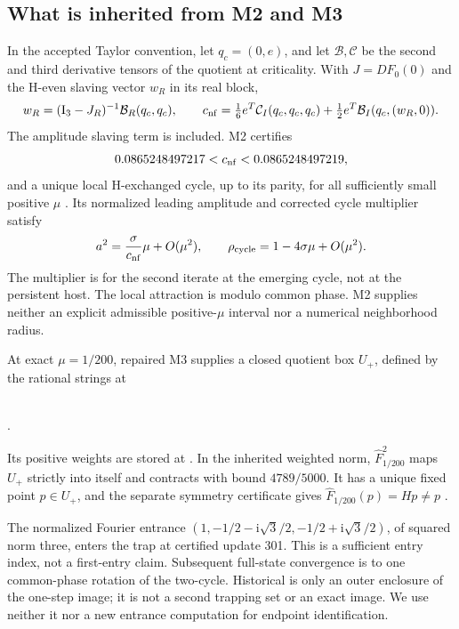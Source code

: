 \documentclass[11pt,a4paper]{article}
\numberwithin{equation}{section}
\newcommand{\Fh}{\widehat F}\newcommand{\eps}{\varepsilon}
\newcommand{\iu}{\mathrm i}\newcommand{\one}{\mathbf 1}
\begin{document}
\subsection{What is inherited from M2 and M3}\label{sec:inherited}
In the accepted Taylor convention, let $q_c=(0,e)$, and let $\mathcal B,\mathcal C$ be the second and third derivative tensors of the quotient at criticality. With $J=D\Fh_0(0)$ and the H-even slaving vector $w_R$ in its real block,
\begin{equation}
w_R=(\mathrm I_3-J_R)^{-1}\mathcal B_R(q_c,q_c),\qquad
c_{\rm nf}=\tfrac16 e^T\mathcal C_I(q_c,q_c,q_c)
             +\tfrac12 e^T\mathcal B_I(q_c,(w_R,0)).\label{eq:cnf}
\end{equation}
The amplitude slaving term is included. M2 certifies
\begin{equation}
0.0865248497217<c_{\rm nf}<0.0865248497219,\label{eq:c-bound}
\end{equation}
and a unique local H-exchanged cycle, up to its parity, for all sufficiently small positive $\mu$ \cite{M2,PG}. Its normalized leading amplitude and corrected cycle multiplier satisfy
\begin{equation}
a^2=\frac{\sigma}{c_{\rm nf}}\mu+O(\mu^2),\qquad
\rho_{\rm cycle}=1-4\sigma\mu+O(\mu^2).\label{eq:m2-laws}
\end{equation}
The multiplier is for the second iterate at the emerging cycle, not at the persistent host. The local attraction is modulo common phase. M2 supplies neither an explicit admissible positive-$\mu$ interval nor a numerical neighborhood radius.

At exact $\mu=1/200$, repaired M3 supplies a closed quotient box $U_+$, defined by the rational strings at
\begin{center}\small
{}\\
.
\end{center}
Its positive weights are stored at . In the inherited weighted norm, $\Fh_{1/200}^2$ maps $U_+$ strictly into itself and contracts with bound $4789/5000$. It has a unique fixed point $p\in U_+$, and the separate symmetry certificate gives $\Fh_{1/200}(p)=Hp\ne p$ \cite{M3,PG}.

The normalized Fourier entrance $(1,-1/2-\iu\sqrt3/2,-1/2+\iu\sqrt3/2)$, of squared norm three, enters the trap at certified update 301. This is a sufficient entry index, not a first-entry claim. Subsequent full-state convergence is to one common-phase rotation of the two-cycle. Historical  is only an outer enclosure of the one-step image; it is not a second trapping set or an exact image. We use neither it nor a new entrance computation for endpoint identification.
\end{document}
